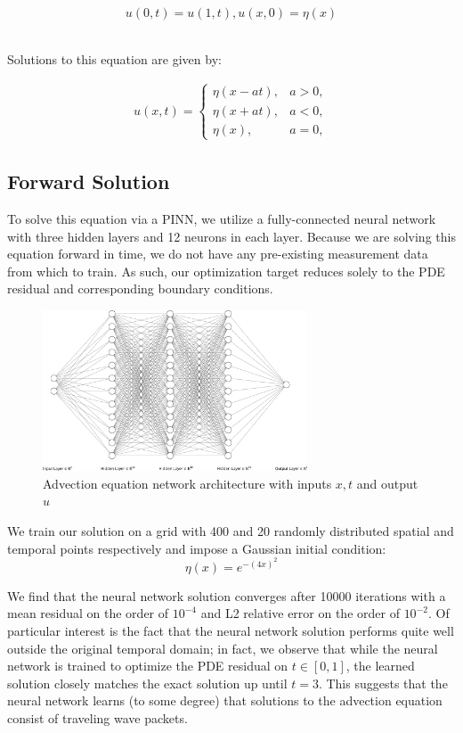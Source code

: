 \documentclass[letterpaper,11pt]{article}
\begin{document}
    $$
    u(0, t) = u(1, t), u(x, 0) = \eta(x)
    $$


    \ \\
    Solutions to this equation are given by:

    \begin{align*}
    u(x, t) = \begin{cases}
        \eta(x - at), &a > 0, \\
        \eta(x + at), &a < 0, \\
        \eta(x), &a = 0,
    \end{cases}
    \end{align*}


    \subsection*{Forward Solution}{\label{sec:advection-equation-forwared}}
    To solve this equation via a PINN, we utilize a fully-connected neural network with three hidden layers and 12 
    neurons in each layer. Because we are solving this equation forward in time, we do not have any pre-existing 
    measurement data from which to train. As such, our optimization target reduces solely to the PDE residual and 
    corresponding boundary conditions.


    \begin{figure}[h]
        \centering
        \includegraphics[width=0.70\textwidth]{nn.png}
        \caption{Advection equation network architecture with inputs $x, t$ and output $u$}
    \end{figure}

    We train our solution on a grid with 400 and 20 randomly distributed spatial and temporal points respectively and
    impose a Gaussian initial condition:
    $$
    \eta(x) = e^{-(4x)^2}
    $$
    
    We find that the neural network solution converges after 10000 iterations with a mean residual on the order of 
    $10^{-4}$ and L2 relative error on the order of $10^{-2}$. Of particular interest is the fact that the neural 
    network solution performs quite well outside the original temporal domain; in fact, we observe that while the neural
    network is trained to optimize the PDE residual on $t \in [0, 1]$, the learned solution closely matches the exact 
    solution up until $t=3$. This suggests that the neural network learns (to some degree) that solutions to the 
    advection equation consist of traveling wave packets.
\end{document}
